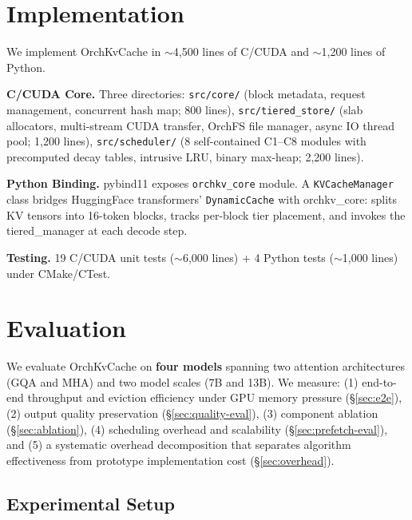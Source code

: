 \documentclass[conference]{IEEEtran}
\begin{document}
\section{Implementation}

We implement OrchKvCache in ${\sim}$4,500 lines of C/CUDA and ${\sim}$1,200 lines of Python.

\textbf{C/CUDA Core.} Three directories: \texttt{src/core/} (block metadata, request management, concurrent hash map; 800 lines), \texttt{src/tiered\_store/} (slab allocators, multi-stream CUDA transfer, OrchFS file manager, async IO thread pool; 1,200 lines), \texttt{src/scheduler/} (8 self-contained C1--C8 modules with precomputed decay tables, intrusive LRU, binary max-heap; 2,200 lines).

\textbf{Python Binding.} pybind11 exposes \texttt{orchkv\_core} module. A \texttt{KVCacheManager} class bridges HuggingFace transformers' \texttt{DynamicCache} with orchkv\_core: splits KV tensors into 16-token blocks, tracks per-block tier placement, and invokes the tiered\_manager at each decode step.

\textbf{Testing.} 19 C/CUDA unit tests (${\sim}$6,000 lines) + 4 Python tests (${\sim}$1,000 lines) under CMake/CTest.

\section{Evaluation}


We evaluate OrchKvCache on \textbf{four models} spanning two attention architectures (GQA and MHA) and two model scales (7B and 13B). We measure: (1) end-to-end throughput and eviction efficiency under GPU memory pressure (\S\ref{sec:e2e}), (2) output quality preservation (\S\ref{sec:quality-eval}), (3) component ablation (\S\ref{sec:ablation}), (4) scheduling overhead and scalability (\S\ref{sec:prefetch-eval}), and (5) a systematic overhead decomposition that separates algorithm effectiveness from prototype implementation cost (\S\ref{sec:overhead}).

\subsection{Experimental Setup}
\end{document}
